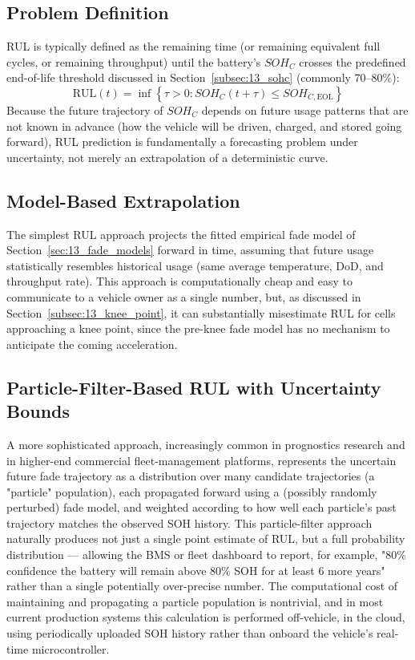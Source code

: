 \subsection{Problem Definition}
\label{subsec:13_rul_definition}

RUL is typically defined as the remaining time (or remaining equivalent full cycles, or remaining throughput) until the battery's $SOH_C$ crosses the predefined end-of-life threshold discussed in Section~\ref{subsec:13_sohc} (commonly 70–80\%):
\begin{equation}
    \text{RUL}(t) = \inf \left\{ \tau > 0 : SOH_C(t + \tau) \le SOH_{C,\text{EOL}} \right\}
    \label{eq:13_rul_definition}
\end{equation}
Because the future trajectory of $SOH_C$ depends on future usage patterns that are not known in advance (how the vehicle will be driven, charged, and stored going forward), RUL prediction is fundamentally a forecasting problem under uncertainty, not merely an extrapolation of a deterministic curve.

\subsection{Model-Based Extrapolation}
\label{subsec:13_rul_model_based}

The simplest RUL approach projects the fitted empirical fade model of Section~\ref{sec:13_fade_models} forward in time, assuming that future usage statistically resembles historical usage (same average temperature, DoD, and throughput rate). This approach is computationally cheap and easy to communicate to a vehicle owner as a single number, but, as discussed in Section~\ref{subsec:13_knee_point}, it can substantially misestimate RUL for cells approaching a knee point, since the pre-knee fade model has no mechanism to anticipate the coming acceleration.

\subsection{Particle-Filter-Based RUL with Uncertainty Bounds}
\label{subsec:13_rul_particle_filter}

A more sophisticated approach, increasingly common in prognostics research and in higher-end commercial fleet-management platforms, represents the uncertain future fade trajectory as a distribution over many candidate trajectories (a "particle" population), each propagated forward using a (possibly randomly perturbed) fade model, and weighted according to how well each particle's past trajectory matches the observed SOH history. This particle-filter approach naturally produces not just a single point estimate of RUL, but a full probability distribution — allowing the BMS or fleet dashboard to report, for example, "80\% confidence the battery will remain above 80\% SOH for at least 6 more years" rather than a single potentially over-precise number. The computational cost of maintaining and propagating a particle population is nontrivial, and in most current production systems this calculation is performed off-vehicle, in the cloud, using periodically uploaded SOH history rather than onboard the vehicle's real-time microcontroller.



